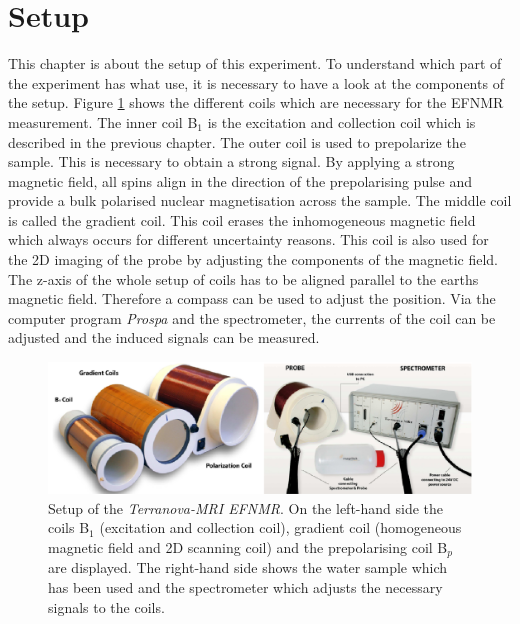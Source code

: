 \section{Setup}
\label{sec:Aufbau}
This chapter is about the setup of this experiment.
To understand which part of the experiment has what use, it is necessary to have a look at the components of the setup.\newline
Figure \ref{fig:Aufbau} shows the different coils which are necessary for the EFNMR measurement.
The inner coil B$_1$ is the excitation and collection coil which is described in the previous chapter.
The outer coil is used to prepolarize the sample.
This is necessary to obtain a strong signal.
By applying a strong magnetic field, all spins align in the direction of the prepolarising pulse and provide a bulk polarised nuclear magnetisation across the sample.
The middle coil is called the gradient coil.
This coil erases the inhomogeneous magnetic field which always occurs for different uncertainty reasons.
This coil is also used for the 2D imaging of the probe by adjusting the components of the magnetic field.\newline
The z-axis of the whole setup of coils has to be aligned parallel to the earths magnetic field.
Therefore a compass can be used to adjust the position.
Via the computer program \textit{Prospa} and the spectrometer, the currents of the coil can be adjusted and the induced signals can be measured.
\begin{figure}[H]
    \centering
    \includegraphics[width= \textwidth]{Abbildungen/Aufbau.png}   
    \caption[Setup of the \textit{Terranova-MRI EFNMR}. \cite{Bild}]{Setup of the \textit{Terranova-MRI EFNMR}.
    On the left-hand side the coils B$_1$ (excitation and collection coil), gradient coil (homogeneous magnetic field and 2D scanning coil) and the prepolarising coil B$_p$ are displayed.
    The right-hand side shows the water sample which has been used and the spectrometer which adjusts the necessary signals to the coils. \cite{Bild}}
    \label{fig:Aufbau}
\end{figure}